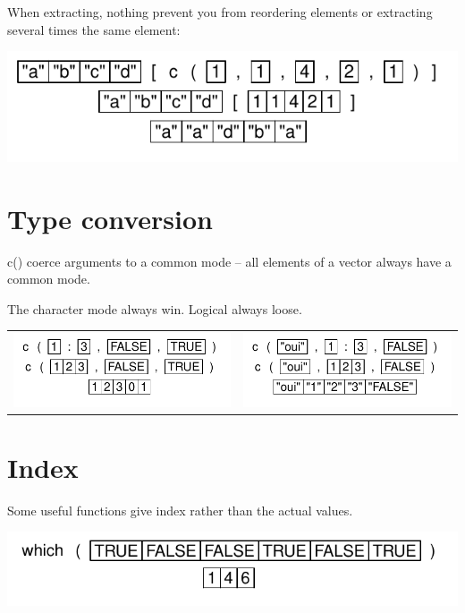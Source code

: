 \documentclass[pdflatex]{article}
\begin{document}
When extracting, nothing prevent you from reordering elements or extracting  several times the same element:

\includegraphics{extract_repeating}

\section{Type conversion}

c() coerce arguments to a common mode -- all elements of a vector always have a common mode.

The character mode always win. Logical always loose.

\begin{tabular}{cc}
\includegraphics{conversion_1} & \includegraphics{conversion}\\
\end{tabular}

\section{Index}

Some useful functions give index rather than the actual values.

\includegraphics{which}
\end{document}
